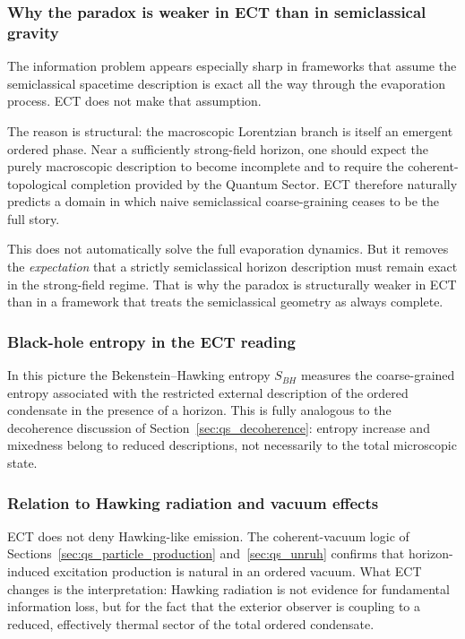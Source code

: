 \subsubsection*{Why the paradox is weaker in ECT than in semiclassical gravity}

The information problem appears especially sharp in frameworks that assume
the semiclassical spacetime description is exact all the way through the
evaporation process.
ECT does not make that assumption.

The reason is structural: the macroscopic Lorentzian branch is itself an
emergent ordered phase.
Near a sufficiently strong-field horizon, one should expect the purely
macroscopic description to become incomplete and to require the
coherent-topological completion provided by the Quantum Sector.
ECT therefore naturally predicts a domain in which naive semiclassical
coarse-graining ceases to be the full story.

This does not automatically solve the full evaporation dynamics.
But it removes the \emph{expectation} that a strictly semiclassical
horizon description must remain exact in the strong-field regime.
That is why the paradox is structurally weaker in ECT than in a framework
that treats the semiclassical geometry as always complete.

\subsubsection*{Black-hole entropy in the ECT reading}

In this picture the Bekenstein--Hawking entropy $S_{BH}$ measures the
coarse-grained entropy associated with the restricted external
description of the ordered condensate in the presence of a horizon.
This is fully analogous to the decoherence discussion
of Section~\ref{sec:qs_decoherence}: entropy increase and mixedness
belong to reduced descriptions, not necessarily to the total
microscopic state.

\subsubsection*{Relation to Hawking radiation and vacuum effects}

ECT does not deny Hawking-like emission.
The coherent-vacuum logic of Sections~\ref{sec:qs_particle_production}
and~\ref{sec:qs_unruh} confirms that horizon-induced excitation
production is natural in an ordered vacuum.
What ECT changes is the interpretation: Hawking radiation is not
evidence for fundamental information loss, but for the fact that the
exterior observer is coupling to a reduced, effectively thermal sector
of the total ordered condensate.

